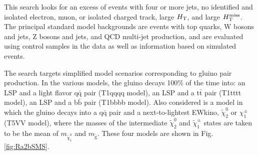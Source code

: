 
This search \cite{Khachatryan:2016kdk} looks for an excess of events
with four or more jets,
no identified and isolated electron, muon,
or isolated charged track,
large $H_{\rm T}$, and large $H_{\text{T}}^{\rm miss}$.
The principal standard model backgrounds are
 events with top quarks,
W bosons and jets,
Z bosons and jets,
and QCD multi-jet production,
and are evaluated using control samples in the data as well 
as information based on simulated events.

The search targets simplified model scenarios corresponding to  
gluino pair production.
In the various models, the gluino decays 100\% of the time into: 
 an LSP and  a light flavor q$\bar{\text{q}}$ pair (T1qqqq model), 
 an LSP and a t$\bar{\text{t}}$ pair  (T1tttt model), 
 an LSP and a b$\bar{\text{b}}$ pair (T1bbbb model).
Also considered is a model in which the gluino decays into
a q$\bar{\text{q}}$ pair and
a next-to-lightest EWkino, $\tilde{\chi}^{0}_{2}$ or $\chi^{\pm}_{1}$ (T5VV model), where 
the masses of the intermediate $\tilde{\chi}^{0}_{2}$ and $\tilde{\chi}^{\pm}_{1}$  states
are taken to be the mean of $m_{\tilde{\chi}^{0}_{1}}$ and $m_{\tilde{\text{g}}}$.
These four models are shown in 
Fig. \ref{fig:Ra2bSMS}.
